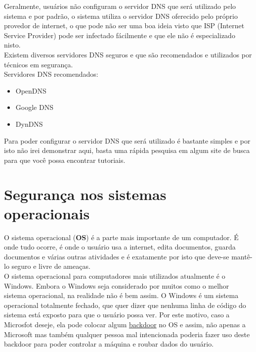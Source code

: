 \documentclass[12pt, letterpaper]{report}
\begin{document}
	Geralmente, usuários não configuram o servidor DNS que será utilizado pelo sistema e por padrão, o sistema utiliza o servidor DNS oferecido pelo próprio provedor de internet, o que pode não ser uma boa ideia visto que ISP (Internet Service Provider) pode ser infectado fácilmente e que ele não é especializado nisto.\\


	Existem diversos servidores DNS seguros e que são recomendados e utilizados por técnicos em segurança.\\

	Servidores DNS recomendados:

	\begin{itemize} %
		\item OpenDNS
		\item Google DNS
		\item DynDNS
%
	\end{itemize} %

	Para poder configurar o servidor DNS que será utilizado é bastante simples e por isto não irei demonstrar aqui, basta uma rápida pesquisa em algum site de busca para que você possa encontrar tutoriais.\\

\pagebreak

\section*{Segurança nos sistemas operacionais}
	O sistema operacional (\textbf{OS}) é a parte mais importante de um computador. É onde tudo ocorre, é onde o usuário usa a internet, edita documentos, guarda documentos e várias outras atividades e é exatamente por isto que deve-se mantê-lo seguro e livre de ameaças.\\

	O sistema operacional para computadores mais utilizados atualmente é o Windows. Embora o Windows seja considerado por muitos como o melhor sistema operacional, na realidade não é bem assim. O Windows é um sistema operacional totalmente fechado, que quer dizer que nenhuma linha de código do sistema está exposto para que o usuário possa ver. Por este motivo, caso a Microsfot  deseje, ela pode colocar algum \href{https://criptowiki.miraheze.org/wiki/Backdoors}{backdoor} no OS e assim, não apenas a Microsoft mas também qualquer pessoa mal intencionada poderia fazer uso deste backdoor para poder controlar a máquina e roubar dados do usuário.\\
\end{document}
